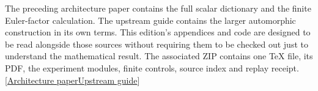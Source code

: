 \documentclass[12pt,letterpaper]{article}
\begin{document}
The preceding architecture paper contains the full scalar dictionary and the finite Euler-factor calculation. The upstream guide contains the larger automorphic construction in its own terms. This edition's appendices and code are designed to be read alongside those sources without requiring them to be checked out just to understand the mathematical result. The associated ZIP contains one TeX file, its PDF, the experiment modules, finite controls, source index and replay receipt.  {\footnotesize\sffamily\color{mute}[\href{https://github.com/nousentllc/riemann-hypothesis/blob/4cdf3cd78bfd1cdd847728aaebe5972d2ead3095/research/uriel/experiments/window-remainder-architecture/From_Arithmetic_Windows_to_a_Prime_Remainder.pdf}{Architecture paper}\enspace \href{https://github.com/leanprover-community/riemann-hypothesis/blob/e063a923620ee7787b4a1270421478645bf66bdb/GUIDE.md\#L1}{Upstream guide}]}
\end{document}
